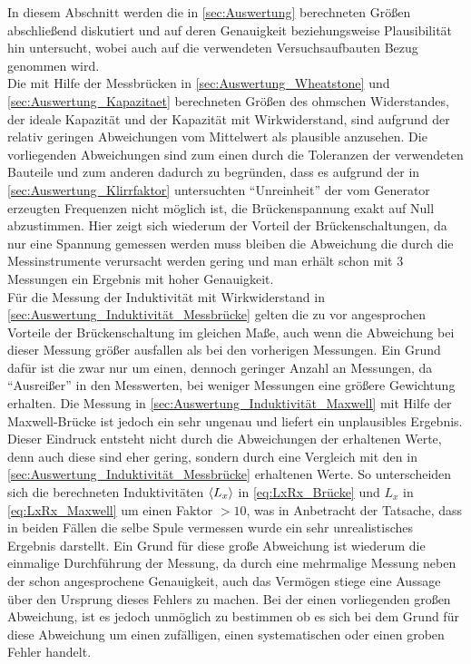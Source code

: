 In diesem Abschnitt werden die in \cref{sec:Auswertung} berechneten 
Größen abschließend diskutiert und auf deren Genauigkeit beziehungsweise
Plausibilität hin untersucht, wobei auch auf die verwendeten
Versuchsaufbauten Bezug genommen wird.\\

Die mit Hilfe der Messbrücken in \cref{sec:Auswertung_Wheatstone} und \ref{sec:Auswertung_Kapazitaet} 
berechneten Größen des ohmschen Widerstandes, der ideale Kapazität und der Kapazität mit Wirkwiderstand,
sind aufgrund der relativ geringen Abweichungen vom Mittelwert als plausible anzusehen. 
Die vorliegenden Abweichungen  sind zum einen durch die Toleranzen der verwendeten Bauteile 
und zum anderen dadurch zu begründen, dass es aufgrund der in \cref{sec:Auswertung_Klirrfaktor} untersuchten
\enquote{Unreinheit} der vom Generator erzeugten Frequenzen nicht möglich ist, die Brückenspannung exakt 
auf Null abzustimmen.  
Hier zeigt sich wiederum der Vorteil der Brückenschaltungen, da nur eine Spannung gemessen werden muss
bleiben die Abweichung die durch die Messinstrumente verursacht werden gering und man erhält schon  
mit 3 Messungen ein Ergebnis mit hoher Genauigkeit.\\
  
Für die Messung der Induktivität mit Wirkwiderstand in \cref{sec:Auswertung_Induktivität_Messbrücke}
gelten die zu vor angesprochen Vorteile der Brückenschaltung im gleichen Maße, auch wenn die
Abweichung bei dieser Messung größer ausfallen als bei den vorherigen Messungen. Ein Grund dafür ist  
die zwar nur um einen, dennoch geringer Anzahl an Messungen, da \enquote{Ausreißer} in den Messwerten,
bei weniger Messungen eine größere Gewichtung erhalten.  
Die Messung in \cref{sec:Auswertung_Induktivität_Maxwell} mit Hilfe der Maxwell-Brücke ist jedoch
ein sehr ungenau und liefert ein unplausibles Ergebnis. Dieser Eindruck entsteht nicht durch die Abweichungen der
erhaltenen Werte, denn auch diese sind eher gering, sondern durch eine Vergleich mit den in
\cref{sec:Auswertung_Induktivität_Messbrücke} erhaltenen Werte. So unterscheiden sich die berechneten Induktivitäten
$\langle L_{x}\rangle$ in \cref{eq:LxRx_Brücke} und $L_{x}$ in \cref{eq:LxRx_Maxwell} um einen Faktor $> 10$, was in Anbetracht der 
Tatsache, dass in beiden Fällen die selbe Spule vermessen wurde ein sehr unrealistisches Ergebnis darstellt.
Ein Grund für diese große Abweichung ist wiederum die einmalige Durchführung der Messung, da durch eine mehrmalige
Messung neben der schon angesprochene Genauigkeit, auch das Vermögen stiege eine Aussage über den Ursprung dieses Fehlers zu 
machen. Bei der einen vorliegenden großen Abweichung, ist es jedoch unmöglich zu bestimmen ob es sich bei
dem Grund für diese Abweichung um einen zufälligen, einen systematischen oder einen groben Fehler handelt.\\
\pagebreak

